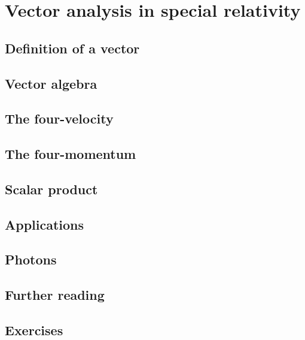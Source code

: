 \documentclass[gr-notes.tex]{subfiles}
\begin{document}
\setcounter{chapter}{1}

\chapter{Vector analysis in special relativity}

\section{Definition of a vector}

\section{Vector algebra}

\section{The four-velocity}

\section{The four-momentum}

\section{Scalar product}

\section{Applications}

\section{Photons}

\section{Further reading}

\section{Exercises}
\end{document}
